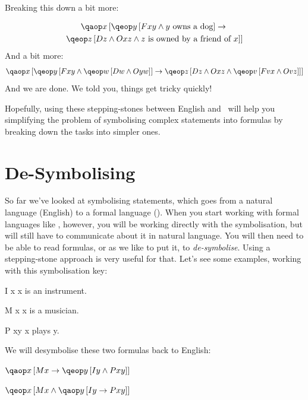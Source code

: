 \documentclass[PHIL101-Textbook.tex]{subfiles}
\begin{document}
Breaking this down a bit more:

\begin{multline*}
	\qab{x}{\qeb{y}{\atom F xy  \eand y\text{ owns a dog}}\eif {}\\
\qeb{z}{\atom D z \eand \atom O xz \eand z\text{ is owned by a friend of }x}}
\end{multline*}
And a bit more: 
\begin{multline*}
\qab{x}{\qeb{y}{\atom F xy  \eand \qeb{w}{\atom D w \eand \atom O yw}} \eif {} 
\qeb{z}{\atom D z \eand \atom O xz \eand \qeb{v}{\atom F vx \eand \atom O vz}}}
\end{multline*}
And we are done.
We told you, things get tricky quickly!

Hopefully, using these stepping-stones between English and \pl\ will help you simplifying the problem of symbolising complex statements into formulas by breaking down the tasks into simpler ones. 

\section{De-Symbolising}

\begin{center}
  \href{https://youtu.be/XY7_q3fj1SU}
  {}
\end{center}

So far we've looked at symbolising statements, which goes from a natural language (English) to a formal language (\pl). When you start working with formal languages like \pl, however, you will be working directly with the symbolisation, but will still have to communicate about it in natural language. You will then need to be able to read formulas, or as we like to put it, to \emph{de-symbolise}. Using a stepping-stone approach is very useful for that. Let's see some examples, working with this symbolisation key:

\begin{ekey}
\item[\atom I x] x is an instrument.
\item[\atom M x ] x is a musician.
\item[\atom P xy ] x plays y.
\end{ekey}

\noindent We will desymbolise these two formulas back to English:

\begin{earg}
\item[\ex{music1}] $\qab{x}{\atom M x \eif \qeb{y}{\atom I y \eand \atom P  xy }}$
\item[\ex{music2}] $\qeb{x}{\atom M x \eand \qab{y}{\atom I y \eif \atom P  xy }}$
\end{earg}
\end{document}
